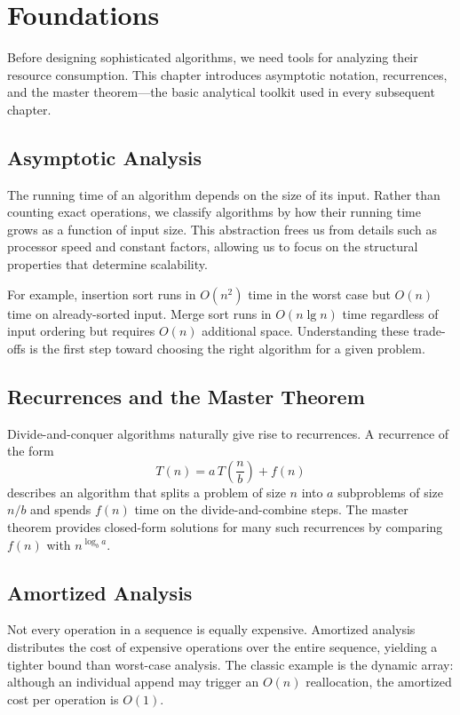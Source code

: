 \documentclass[
    language=english,
    doctype=book,
    institution=none,
    titlestyle=book
]{../../omnilatex}
\begin{document}
\chapter{Foundations}\label{ch:foundations}

Before designing sophisticated algorithms, we need tools for analyzing their resource consumption. This chapter introduces asymptotic notation, recurrences, and the master theorem---the basic analytical toolkit used in every subsequent chapter.

\section{Asymptotic Analysis}

The running time of an algorithm depends on the size of its input. Rather than counting exact operations, we classify algorithms by how their running time grows as a function of input size. This abstraction frees us from details such as processor speed and constant factors, allowing us to focus on the structural properties that determine scalability.

For example, insertion sort runs in $O(n^2)$ time in the worst case but $O(n)$ time on already-sorted input. Merge sort runs in $O(n \lg n)$ time regardless of input ordering but requires $O(n)$ additional space. Understanding these trade-offs is the first step toward choosing the right algorithm for a given problem.

\section{Recurrences and the Master Theorem}

Divide-and-conquer algorithms naturally give rise to recurrences. A recurrence of the form
\[
T(n) = a\,T\!\left(\frac{n}{b}\right) + f(n)
\]
describes an algorithm that splits a problem of size $n$ into $a$ subproblems of size $n/b$ and spends $f(n)$ time on the divide-and-combine steps. The master theorem provides closed-form solutions for many such recurrences by comparing $f(n)$ with $n^{\log_b a}$.

\section{Amortized Analysis}

Not every operation in a sequence is equally expensive. Amortized analysis distributes the cost of expensive operations over the entire sequence, yielding a tighter bound than worst-case analysis. The classic example is the dynamic array: although an individual append may trigger an $O(n)$ reallocation, the amortized cost per operation is $O(1)$.
\end{document}

